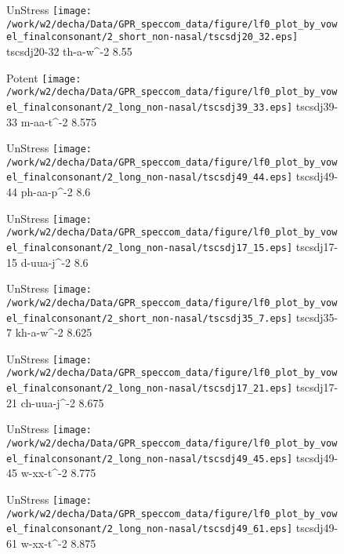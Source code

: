 \documentclass{article}
\begin{document}
\begin{figure}[t]
\begin{minipage}[b]{.24\textwidth}
UnStress
\centering
\texttt{[image: /work/w2/decha/Data/GPR\_speccom\_data/figure/lf0\_plot\_by\_vowel\_finalconsonant/2\_short\_non-nasal/tscsdj20\_32.eps]}
tscsdj20-32 th-a-w\textasciicircum-2 8.55
\end{minipage}
\begin{minipage}[b]{.24\textwidth}
\colorbox{Apricot}{Potent}
\centering
\texttt{[image: /work/w2/decha/Data/GPR\_speccom\_data/figure/lf0\_plot\_by\_vowel\_finalconsonant/2\_long\_non-nasal/tscsdj39\_33.eps]}
tscsdj39-33 m-aa-t\textasciicircum-2 8.575
\end{minipage}
\begin{minipage}[b]{.24\textwidth}
UnStress
\centering
\texttt{[image: /work/w2/decha/Data/GPR\_speccom\_data/figure/lf0\_plot\_by\_vowel\_finalconsonant/2\_long\_non-nasal/tscsdj49\_44.eps]}
tscsdj49-44 ph-aa-p\textasciicircum-2 8.6
\end{minipage}
\begin{minipage}[b]{.24\textwidth}
UnStress
\centering
\texttt{[image: /work/w2/decha/Data/GPR\_speccom\_data/figure/lf0\_plot\_by\_vowel\_finalconsonant/2\_long\_non-nasal/tscsdj17\_15.eps]}
tscsdj17-15 d-uua-j\textasciicircum-2 8.6
\end{minipage}
\end{figure}
\clearpage
\begin{figure}[t]
\begin{minipage}[b]{.24\textwidth}
UnStress
\centering
\texttt{[image: /work/w2/decha/Data/GPR\_speccom\_data/figure/lf0\_plot\_by\_vowel\_finalconsonant/2\_short\_non-nasal/tscsdj35\_7.eps]}
tscsdj35-7 kh-a-w\textasciicircum-2 8.625
\end{minipage}
\begin{minipage}[b]{.24\textwidth}
UnStress
\centering
\texttt{[image: /work/w2/decha/Data/GPR\_speccom\_data/figure/lf0\_plot\_by\_vowel\_finalconsonant/2\_long\_non-nasal/tscsdj17\_21.eps]}
tscsdj17-21 ch-uua-j\textasciicircum-2 8.675
\end{minipage}
\begin{minipage}[b]{.24\textwidth}
UnStress
\centering
\texttt{[image: /work/w2/decha/Data/GPR\_speccom\_data/figure/lf0\_plot\_by\_vowel\_finalconsonant/2\_long\_non-nasal/tscsdj49\_45.eps]}
tscsdj49-45 w-xx-t\textasciicircum-2 8.775
\end{minipage}
\begin{minipage}[b]{.24\textwidth}
UnStress
\centering
\texttt{[image: /work/w2/decha/Data/GPR\_speccom\_data/figure/lf0\_plot\_by\_vowel\_finalconsonant/2\_long\_non-nasal/tscsdj49\_61.eps]}
tscsdj49-61 w-xx-t\textasciicircum-2 8.875
\end{minipage}
\end{figure}
\end{document}
